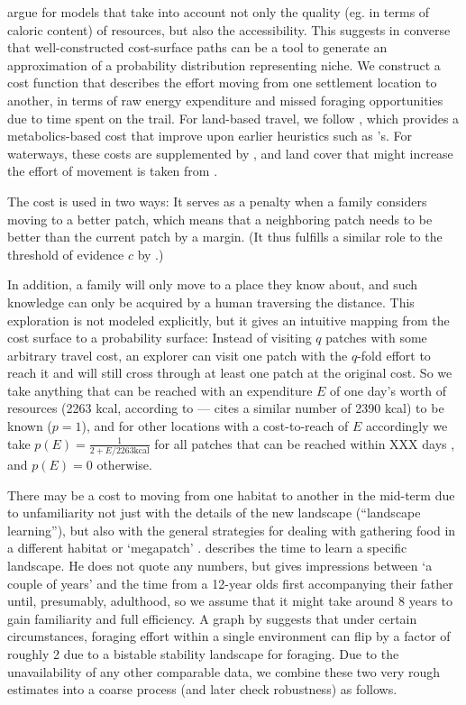 \documentclass[a4paper,12pt]{scrartcl}
\begin{document}
\Textcite{steele2003where} argue for models that take into account not only the
quality (eg. in terms of caloric content) of resources, but also the
accessibility. This suggests in converse that well-constructed cost-surface
paths can be a tool to generate an approximation of a probability distribution
representing niche. We construct a cost function that describes the effort
moving from one settlement location to another, in terms of raw energy
expenditure and missed foraging opportunities due to time spent on the trail.
For land-based travel, we follow \textcite{wood2006energetically}, which
provides a metabolics-based cost that improve upon earlier heuristics such as
\textcite{tobler1993three}'s. For waterways, these costs are supplemented by
\textcite{livingood2012no}, and land cover that might increase the effort of
movement is taken from \cite{white2012geospatial}.

The cost is used in two ways: It serves as a penalty when a family considers
moving to a better patch, which means that a neighboring patch needs to be
better than the current patch by a margin. (It thus fulfills a similar role to
the threshold of evidence $c$ by \textcite{crema2014simulation}.)

In addition, a family will only move to a place they know about, and such
knowledge can only be acquired by a human traversing the distance. This
exploration is not modeled explicitly, but it gives an intuitive mapping from
the cost surface to a probability surface: Instead of visiting $q$ patches with
some arbitrary travel cost, an explorer can visit one patch with the $q$-fold
effort to reach it and will still cross through at least one patch at the
original cost. So we take anything that can be reached with an expenditure $E$
of one day's worth of resources (2263 kcal, according to
\textcite{pontzer2012huntergatherer}---\textcite{smith2003assessment} cites a
similar number of 2390 kcal) to be known ($p=1$), and for other locations with a
cost-to-reach of $E$ accordingly we take $p(E) = \frac{1}{2 + E / {2263 \text{
      kcal}}}$ for all patches that can be reached within XXX days \parencite{},
and $p(E) = 0$ otherwise.

There may be a cost to moving from one habitat to another in the mid-term due to
unfamiliarity not just with the details of the new landscape (“landscape
learning”), but also with the general strategies for dealing with gathering food
in a different habitat or ‘megapatch’ \parencite{kelly2003colonization}.
\Textcite{kelly2003colonization} describes the time to learn a specific
landscape. He does not quote any numbers, but gives impressions between ‘a
couple of years’ and the time from a 12-year olds first accompanying their
father until, presumably, adulthood, so we assume that it might take around 8
years to gain familiarity and full efficiency. A graph by \Textcite[Fig.
4]{freeman2017theory} suggests that under certain circumstances, foraging effort
within a single environment can flip by a factor of roughly 2 due to a bistable
stability landscape for foraging. Due to the unavailability of any other
comparable data, we combine these two very rough estimates into a coarse process
(and later check robustness) as follows.
\end{document}
